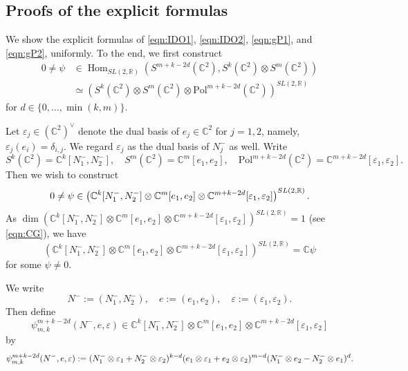 \documentclass[reqno,11pt]{amsart}
\theoremstyle{remark}
\numberwithin{equation}{section}
\newcommand{\eps}{\varepsilon}
\newcommand{\R}{\mathbb{R}}
\newcommand{\C}{\mathbb{C}}
\newcommand{\Hom}{\operatorname{Hom}}
\newcommand{\Pol}{\mathrm{Pol}}
\begin{document}
\subsection{Proofs of the explicit formulas}
\label{sec:proof2}
We show the explicit formulas of 
\eqref{eqn:IDO1},
\eqref{eqn:IDO2},
\eqref{eqn:gP1},
and \eqref{eqn:gP2},
uniformly.
To the end,  we first construct
\begin{align*}
0\neq \psi
&\in \Hom_{SL(2,\R)}(S^{m+k-2d}(\C^2), S^k(\C^2)\otimes S^m(\C^2))\\[3pt]
&\simeq \left(S^k(\C^2) \otimes S^m(\C^2) \otimes 
\Pol^{m+k-2d}(\C^2)\right)^{SL(2,\R)}
\end{align*}
for $d \in \{0, \ldots, \min(k,m)\}$.

Let $\eps_j \in (\C^2)^\vee$ denote 
the dual basis of $e_j\in \C^2$ for $j=1,2$, namely, $\eps_j(e_i) = \delta_{i,j}$.
We regard $\eps_j$ as the dual basis of $N_j^-$ as well.
Write
\begin{equation*}
S^k(\C^2) = \C^k[N_1^-, N_2^-],
\quad
S^m(\C^2)=\C^m[e_1, e_2],
\quad
\Pol^{m+k-2d}(\C^2)=\C^{m+k-2d}[\eps_1,\eps_2].
\end{equation*}
Then we wish to construct
\begin{equation*}
0\neq \psi \in 
\left(\C^k[N_1^-, N_2^-] \otimes \C^m[e_1, e_2] \otimes 
\C^{m+k-2d}[\eps_1, \eps_2]\right)^{SL(2,\R)}.\\[3pt]
\end{equation*}
As
$\dim 
\left(\C^k[N_1^-, N_2^-] \otimes \C^m[e_1, e_2] \otimes 
\C^{m+k-2d}[\eps_1, \eps_2]\right)^{SL(2,\R)}=1$ (see \eqref{eqn:CG}),
we have 
\begin{equation*}
\left(\C^k[N_1^-, N_2^-] \otimes \C^m[e_1, e_2] \otimes 
\C^{m+k-2d}[\eps_1, \eps_2]\right)^{SL(2,\R)}
=\C\psi
\end{equation*}
for some $\psi \neq 0$.

We write
\begin{equation*}
N^-:=(N_1^-, N_2^-),
\quad
e:=(e_1, e_2),
\quad
\eps:=(\eps_1, \eps_2).
\end{equation*}
Then define 
\begin{equation*}
\psi^{m+k-2d}_{m,k}(N^-, e, \eps)
\in
\C^k[N_1^-, N_2^-] \otimes \C^m[e_1, e_2] \otimes 
\C^{m+k-2d}[\eps_1, \eps_2]
\end{equation*}
by
\begin{equation}\label{eqn:psi}
\psi^{m+k-2d}_{m,k}(N^-, e, \eps)
:=
(N_1^-\otimes \eps_1 + N_2^-\otimes \eps_2)^{k-d}
(e_1\otimes \eps_1 + e_2\otimes \eps_2)^{m-d}
(N_1^-\otimes e_2 - N_2^-\otimes e_1)^{d}.\\[3pt]
\end{equation}
\end{document}
